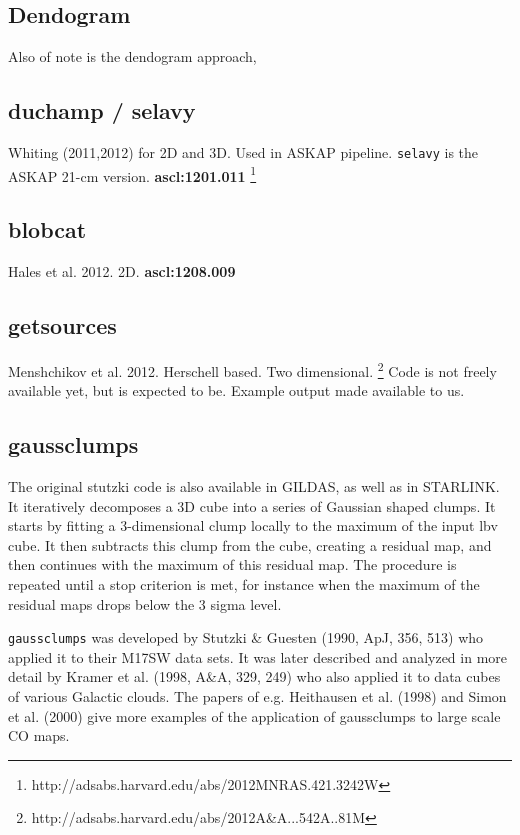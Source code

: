 \documentclass[preprint]{aastex} %
\begin{document}
\subsection{Dendogram}

Also of note is the dendogram approach,



\subsection{duchamp / selavy}

Whiting (2011,2012) for 2D and 3D. Used in ASKAP pipeline. 
{\tt selavy} is the ASKAP 21-cm version. {\bf ascl:1201.011}
\footnote{http://adsabs.harvard.edu/abs/2012MNRAS.421.3242W}

\subsection{blobcat}

Hales et al. 2012.  2D.
{\bf ascl:1208.009}

\subsection{getsources}

Menshchikov et al. 2012. Herschell based. Two dimensional.
\footnote{http://adsabs.harvard.edu/abs/2012A\&A...542A..81M}
Code is not freely available yet, but is expected to be. Example
output made available to us.

\subsection{gaussclumps}

The original stutzki code is also available in GILDAS, as well as in
STARLINK.  It iteratively decomposes a 3D cube into a series of
Gaussian shaped clumps.  It starts by fitting a 3-dimensional clump
locally to the maximum of the input lbv cube. It then subtracts this
clump from the cube, creating a residual map, and then continues with
the maximum of this residual map.  The procedure is repeated until a
stop criterion is met, for instance when the maximum of the residual
maps drops below the 3 sigma level.

{\tt gaussclumps} was developed by Stutzki \& Guesten (1990, ApJ, 356, 513)
who applied it to their M17SW data sets. It was later described and
analyzed in more detail by Kramer et al. (1998, A\&A, 329, 249) who
also applied it to data cubes of various Galactic clouds.  The papers
of e.g. Heithausen et al. (1998) and Simon et al. (2000) give more examples
of the application of gaussclumps to large scale CO maps.
\end{document}
